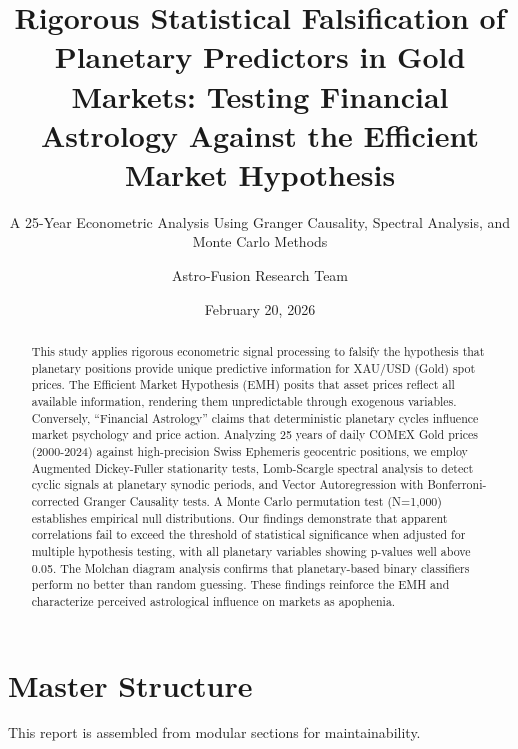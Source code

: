 \documentclass[
  11pt,
  a4paper,
  oneside,
  openany]{article}
\title{Rigorous Statistical Falsification of Planetary Predictors in
Gold Markets: Testing Financial Astrology Against the Efficient Market
Hypothesis}
\subtitle{A 25-Year Econometric Analysis Using Granger Causality,
Spectral Analysis, and Monte Carlo Methods}
\author{Astro-Fusion Research Team}
\date{February 20, 2026}
\renewcommand*\contentsname{Table of contents}
\newcommand\contentsname{Table of contents}
\begin{document}
\maketitle
\begin{abstract}
This study applies rigorous econometric signal processing to falsify the
hypothesis that planetary positions provide unique predictive
information for XAU/USD (Gold) spot prices. The Efficient Market
Hypothesis (EMH) posits that asset prices reflect all available
information, rendering them unpredictable through exogenous variables.
Conversely, ``Financial Astrology'' claims that deterministic planetary
cycles influence market psychology and price action. Analyzing 25 years
of daily COMEX Gold prices (2000-2024) against high-precision Swiss
Ephemeris geocentric positions, we employ Augmented Dickey-Fuller
stationarity tests, Lomb-Scargle spectral analysis to detect cyclic
signals at planetary synodic periods, and Vector Autoregression with
Bonferroni-corrected Granger Causality tests. A Monte Carlo permutation
test (N=1,000) establishes empirical null distributions. Our findings
demonstrate that apparent correlations fail to exceed the threshold of
statistical significance when adjusted for multiple hypothesis testing,
with all planetary variables showing p-values well above 0.05. The
Molchan diagram analysis confirms that planetary-based binary
classifiers perform no better than random guessing. These findings
reinforce the EMH and characterize perceived astrological influence on
markets as apophenia.
\end{abstract}

\renewcommand*\contentsname{Table of contents}
{
\hypersetup{linkcolor=}
\setcounter{tocdepth}{3}
\tableofcontents
}
\listoffigures
\listoftables
{}
\section{Master Structure}\label{master-structure}

\begin{tcolorbox}[enhanced jigsaw, opacitybacktitle=0.6, coltitle=black, toptitle=1mm, left=2mm, title=\textcolor{quarto-callout-note-color}{\faInfo}\hspace{0.5em}{Note}, colback=white, colbacktitle=quarto-callout-note-color!10!white, toprule=.15mm, opacityback=0, arc=.35mm, colframe=quarto-callout-note-color-frame, titlerule=0mm, bottomtitle=1mm, bottomrule=.15mm, breakable, rightrule=.15mm, leftrule=.75mm]

This report is assembled from modular sections for maintainability.

\end{tcolorbox}
\end{document}
